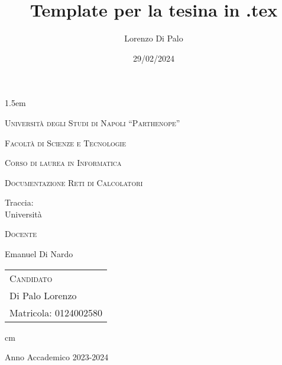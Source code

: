 \documentclass[12pt,italian,a4paper,oneside,openright]{book}
\title{Template per la tesina in .tex}
\author{Lorenzo Di Palo}
\date{29/02/2024}
\begin{document}
	
	\baselineskip 1.5em
	
	{ \thispagestyle{empty}
		
		
		\vskip 1cm \large \centerline{\textsc{Università degli Studi di
				Napoli ``Parthenope''}}
		
		\centerline {\textsc{Facoltà di Scienze e Tecnologie}}
		
		\centerline {\small\textsc{Corso di laurea in Informatica}}
		
	
		
		\vskip 0.5cm
		
		\large \centerline {\textsc{Documentazione Reti di Calcolatori}}
		
		\vskip 0.5cm
		
		\Large \centerline {Traccia:\\Università}
		
		
		\vskip 4.5cm
		
		
		\large
		\begin{minipage}[t]{7cm}
			\textsc{Docente}
			
			Emanuel Di Nardo\\
			
		\end{minipage}
		\hfill
		\begin{tabular}[t]{l}
			\textsc{Candidato} \\
			Di Palo Lorenzo\\
			Matricola: 0124002580
		\end{tabular}
		
		 cm \Large \centerline {Anno Accademico 2023-2024}
		\vfill \eject}
	
	\tableofcontents
	
	\newpage
	
	
	\newpage
	\pagestyle{plain}
	
	
\end{document}
